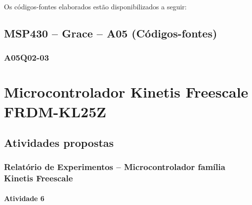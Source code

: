 \documentclass[
	12pt,				%
	openright,			%
  oneside,     %
	a4paper,			%
	english,			%
	french,				%
	spanish,			%
	brazil				%
	]{abntex2}
\begin{document}
\newpage
Os códigos-fontes elaborados estão disponibilizados a seguir:
\section*{MSP430 -- Grace -- A05 (Códigos-fontes)}
\label{sec:GraceA05Q03}
\subsection*{A05Q02-03}












%
%

\chapter{Microcontrolador Kinetis Freescale FRDM-KL25Z} %
\label{cha:6-microcontrolador_kinetis_freescale}

\section{Atividades propostas} %
\label{sec:kinetis_freescale-atividades_propostas}

\subsection*{Relatório de Experimentos -- Microcontrolador família Kinetis Freescale}

\subsubsection*{Atividade 6}
\end{document}
